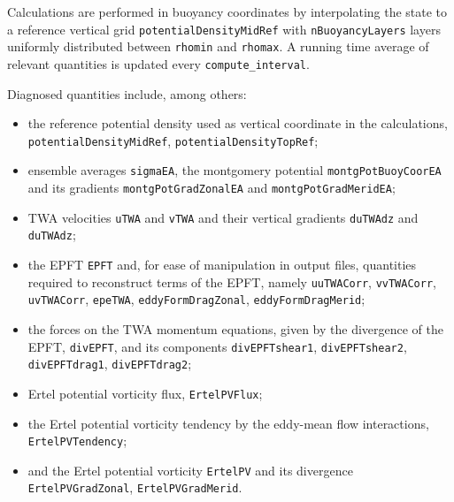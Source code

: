 Calculations are performed in buoyancy coordinates by interpolating the state to a reference vertical grid \verb+potentialDensityMidRef+ with \verb+nBuoyancyLayers+ layers uniformly distributed between \verb+rhomin+ and \verb+rhomax+. 
A running time average of relevant quantities is updated every \verb+compute_interval+.

Diagnosed quantities include, among others: 
\begin{itemize}
\item the reference potential density used as vertical coordinate in the calculations, \verb+potentialDensityMidRef+, \verb+potentialDensityTopRef+;
\item ensemble averages \verb+sigmaEA+, the montgomery potential \verb+montgPotBuoyCoorEA+ and its gradients \verb+montgPotGradZonalEA+ and \verb+montgPotGradMeridEA+; 
\item TWA velocities \verb+uTWA+ and \verb+vTWA+ and their vertical gradients \verb+duTWAdz+ and \verb+duTWAdz+; 
\item the EPFT \verb+EPFT+ and, for ease of manipulation in output files, quantities required to reconstruct terms of the EPFT, namely \verb+uuTWACorr+, \verb+vvTWACorr+, \verb+uvTWACorr+, \verb+epeTWA+, \verb+eddyFormDragZonal+, \verb+eddyFormDragMerid+;
\item the forces on the TWA momentum equations, given by the divergence of the EPFT, \verb+divEPFT+, and its components \verb+divEPFTshear1+, \verb+divEPFTshear2+, \verb+divEPFTdrag1+, \verb+divEPFTdrag2+;
\item Ertel potential vorticity flux, \verb+ErtelPVFlux+;
\item the Ertel potential vorticity tendency by the eddy-mean flow interactions, \verb+ErtelPVTendency+;
\item and the Ertel potential vorticity \verb+ErtelPV+ and its divergence \verb+ErtelPVGradZonal+, \verb+ErtelPVGradMerid+.
\end{itemize}